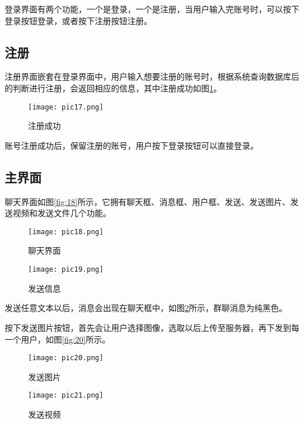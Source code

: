 \documentclass[forprint]{sql}
\begin{document}
登录界面有两个功能，一个是登录，一个是注册，当用户输入完账号时，可以按下登录按钮登录，或者按下注册按钮注册。

\subsection{注册}

注册界面嵌套在登录界面中，用户输入想要注册的账号时，根据系统查询数据库后的判断进行注册，会返回相应的信息，其中注册成功如图\ref{fig:17}。

\begin{figure}[!htbp]
	\centering
	\texttt{[image: pic17.png]}
	\caption{注册成功}
	\label{fig:17}
\end{figure}

账号注册成功后，保留注册的账号，用户按下登录按钮可以直接登录。

\subsection{主界面}

聊天界面如图\ref{fig:18}所示，它拥有聊天框、消息框、用户框、发送、发送图片、发送视频和发送文件几个功能。

\begin{figure}[ht]
	\centering
	\begin{minipage}[t]{0.45\linewidth}
		\centering
		\texttt{[image: pic18.png]}
		\caption{聊天界面}
		\label{fig:18}
	\end{minipage}%
	\begin{minipage}[t]{0.45\linewidth}
		\centering
		\texttt{[image: pic19.png]}
		\caption{发送信息}
		\label{fig:19}
	\end{minipage}%
\end{figure}

发送任意文本以后，消息会出现在聊天框中，如图\ref{fig:19}所示，群聊消息为纯黑色。

按下发送图片按钮，首先会让用户选择图像，选取以后上传至服务器，再下发到每一个用户，如图\ref{fig:20}所示。

\begin{figure}[ht]
	\centering
	\begin{minipage}[t]{0.45\linewidth}
		\centering
		\texttt{[image: pic20.png]}
		\caption{发送图片}
		\label{fig:20}
	\end{minipage}%
	\begin{minipage}[t]{0.45\linewidth}
		\centering
		\texttt{[image: pic21.png]}
		\caption{发送视频}
		\label{fig:21}
	\end{minipage}%
\end{figure}
\end{document}
